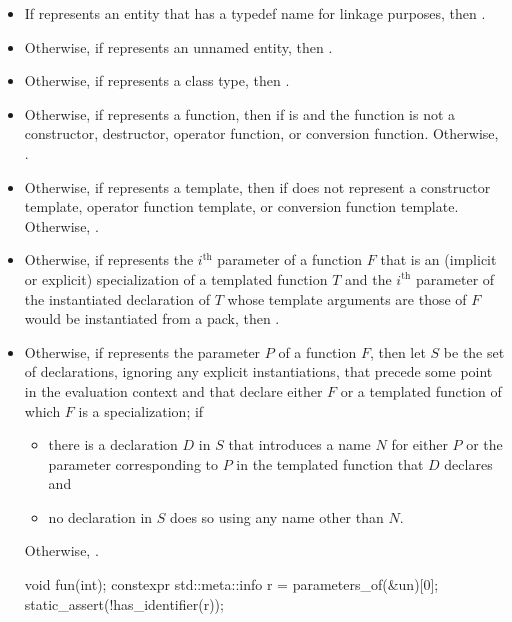 \begin{itemdescr}
\pnum
\returns
\begin{itemize}
\item
  If  represents an entity
  that has a typedef name for linkage purposes,
  then .
\item
  Otherwise, if  represents an unnamed entity,
  then .
\item
  Otherwise, if  represents a class type,
  then .
\item
  Otherwise, if  represents a function,
  then  if  is 
  and the function is not a
  constructor,
  destructor,
  operator function, or
  conversion function.
  Otherwise, .
\item
  Otherwise, if  represents a template,
  then  if  does not represent a
  constructor template,
  operator function template,
  or conversion function template.
  Otherwise, .
\item
  Otherwise, if  represents the $i^\text{th}$ parameter of a function $F$
  that is an (implicit or explicit) specialization of a templated function $T$
  and the $i^\text{th}$ parameter of the instantiated declaration of $T$
  whose template arguments are those of $F$ would be instantiated from a pack,
  then .
\item
  Otherwise, if  represents the parameter $P$ of  a function $F$,
  then let $S$ be the set of declarations,
  ignoring any explicit instantiations,
  that precede some point in the evaluation context
  and that declare either $F$ or a templated function
  of which $F$ is a specialization;
   if
  \begin{itemize}
  \item
    there is a declaration $D$ in $S$ that introduces a name $N$ for either $P$
    or the parameter corresponding to $P$
    in the templated function that $D$ declares and
  \item
    no declaration in $S$ does so using any name other than $N$.
  \end{itemize}
  Otherwise, .
  \begin{example}
\begin{codeblock}
void fun(int);
constexpr std::meta::info r = parameters_of(^^fun)[0];
static_assert(!has_identifier(r));


\end{codeblock}
\end{example}
\end{itemize}
\end{itemdescr}
